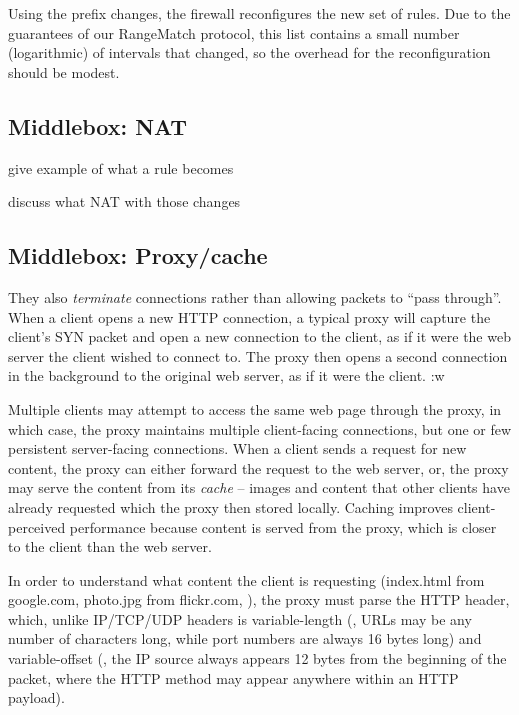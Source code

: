 Using the prefix changes, the firewall 
 reconfigures the new set of rules. Due to the guarantees of our RangeMatch protocol, this list contains a 
small number (logarithmic) of intervals that changed, so the overhead for the reconfiguration should be modest.




\subsection{Middlebox: NAT}\label{sec:nat}

give example of what a rule becomes

discuss what NAT with those changes 


\subsection{Middlebox: Proxy/cache}\label{s:proxy}
They also {\it terminate} connections rather than allowing packets to ``pass through''.
When a client opens a new HTTP connection, a typical proxy will capture the client's SYN packet and open a new connection to the client, as if it were the web server the client wished to connect to. 
The proxy then opens a second connection in the background to the original web server, as if it were the client. :w

Multiple clients may attempt to access the same web page through the proxy, in which case, the proxy maintains multiple client-facing connections, but one or few persistent server-facing connections.
When a client sends a request for new content, the proxy can either forward the request to the web server, or, the proxy may serve the content from its {\it cache} -- images and content that other clients have already requested which the proxy then stored locally. 
Caching improves client-perceived performance because content is served from the proxy, which is closer to the client than the web server.

In order to understand what content the client is requesting (index.html from google.com, photo.jpg from flickr.com, \etc{}), the proxy must parse the HTTP header, which, unlike IP/TCP/UDP headers is variable-length (\eg{}, URLs may be any number of characters long, while port numbers are always 16 bytes long) and variable-offset (\eg{}, the IP source always appears 12 bytes from the beginning of the packet, where the HTTP method may appear anywhere within an HTTP payload).

